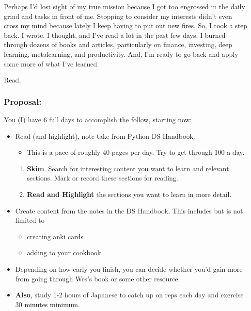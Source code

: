 Perhaps I'd lost sight of my true mission because I got too engrossed in the daily grind and tasks in front of me. Stopping to consider my interests didn't even cross my mind because lately I keep having to put out new fires. So, I took a step back. I wrote, I thought, and I've read  a lot in the past few days. I burned through dozens of books and articles, particularly on finance, investing, deep learning, metalearning, and productivity. And, I'm ready to go back and apply some more of what I've learned.

Read,

\subsubsection*{Proposal:}

You (I) have 6 full days to accomplish the follow, starting now:

\begin{itemize}
	\item
	Read (and highlight), note-take from Python DS Handbook.
	\begin{itemize}
		\item
		This is a pace of roughly 40 pages per day. Try to get through 100 a day.
	\end{itemize}
	\begin{enumerate}
		\item
		\textbf{Skim}. Search for interesting content you want to learn and relevant sections. Mark or record these sections for reading.
		\item
		\textbf{Read and Highlight} the sections you want to learn in more detail.
	\end{enumerate}
	\item
	Create content from the notes in the DS Handbook. This includes but is not limited to
	\begin{itemize}
		\item
		creating anki cards
		\item
		adding to your cookbook
	\end{itemize}

	\item
	Depending on how early you finish, you can decide whether you'd gain more from going through Wes's book or some other resource.
	\item
	\textbf{Also}, study 1-2 hours of Japanese to catch up on reps each day and exercise 30 minutes minimum.
\end{itemize}

